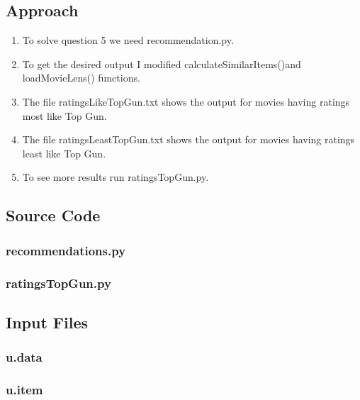 \documentclass[12pt]{article}
\begin{document}
\subsection{Approach}
\begin{enumerate}
\item To solve question 5 we need recommendation.py.
\item To get the desired output I modified calculateSimilarItems()and loadMovieLens() functions.
\item The file ratingsLikeTopGun.txt shows the output for movies having ratings most like Top Gun.
\item The file ratingsLeastTopGun.txt shows the output for movies having ratings least like Top Gun.
\item To see more results run ratingsTopGun.py.

 
     
\end{enumerate}

\newpage
\subsection{Source Code}
\subsubsection{recommendations.py}

\newpage
\subsubsection{ratingsTopGun.py}

\newpage

\subsection{Input Files}
\subsubsection{u.data}

\subsubsection{u.item}

\newpage
\end{document}
